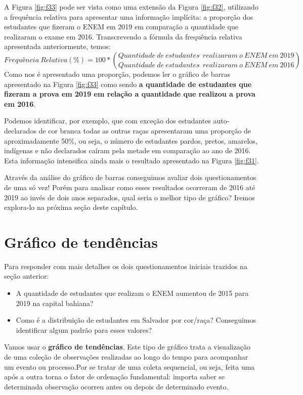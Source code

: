 \documentclass[
  oneside]{book}
\begin{document}
A Figura \ref{fig:f33} pode ser vista como uma extensão da Figura \ref{fig:f32}, utilizando a frequência relativa para apresentar uma informação implícita: a proporção dos estudantes que fizeram o ENEM em 2019 em comparação a quantidade que realizaram o exame em 2016. Transcrevendo a fórmula da frequência relativa apresentada anteriormente, temos:
\[Frequência\ Relativa (\%) = 100*{Quantidade\ de\ estudantes\ \ realizaram\ o\ ENEM\ em\ 2019\choose Quantidade\ de\ estudantes\ \ realizaram\ o\ ENEM\ em\ 2016}\]
Como nos é apresentado uma proporção, podemos ler o gráfico de barras apresentado na Figura \ref{fig:f33} como sendo \textbf{a quantidade de estudantes que fizeram a prova em 2019 em relação a quantidade que realizou a prova em 2016}.

Podemos identificar, por exemplo, que com exceção dos estudantes auto-declarados de cor branca todas as outras raças apresentaram uma proporção de aproximadamente 50\%, ou seja, o número de estudantes pardos, pretos, amarelos, indígenas e não declarados caíram pela metade em comparação ao ano de 2016. Esta informação intensifica ainda mais o resultado apresentado na Figura \ref{fig:f31}.

Através da análise do gráfico de barras conseguimos avaliar dois questionamentos de uma só vez! Porém para analisar como esses resultados ocorreram de 2016 até 2019 ao invés de dois anos separados, qual seria o melhor tipo de gráfico? Iremos explora-lo na próxima seção deste capítulo.

\hypertarget{gtend}{%
\section{Gráfico de tendências}\label{gtend}}

Para responder com mais detalhes os dois questionamentos iniciais trazidos na seção anterior:

\begin{itemize}
\item
  A quantidade de estudantes que realizam o ENEM aumentou de 2015 para 2019 na capital bahiana?
\item
  Como é a distribuição de estudantes em Salvador por cor/raça? Conseguimos identificar algum padrão para esses valores?
\end{itemize}

Vamos usar o \textbf{gráfico de tendências}. Este tipo de gráfico trata a visualização de uma coleção de observações realizadas ao longo do tempo para acompanhar um evento ou processo.Por se tratar de uma coleta sequencial, ou seja, feita uma após a outra torna o fator de ordenação fundamental: importa saber se determinada observação ocorreu antes ou depois de determinado evento.
\end{document}
